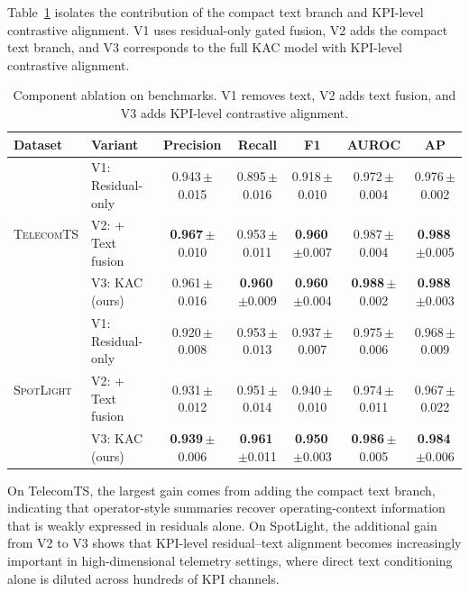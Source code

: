 \documentclass[conference]{IEEEtran}
\newcommand{\sd}[1]{\,{\fontsize{6pt}{7pt}\selectfont $\pm$#1}}
\begin{document}
Table~\ref{tab:ablation} isolates the contribution of the compact text branch and KPI-level contrastive alignment. V1 uses residual-only gated fusion, V2 adds the compact text branch, and V3 corresponds to the full KAC model with KPI-level contrastive alignment.

\begin{table}[t]
  \caption{Component ablation on benchmarks. V1 removes text, V2 adds text fusion, and V3 adds KPI-level contrastive alignment.}
  \label{tab:ablation}
  \small
  \setlength{\tabcolsep}{4pt}
  \begin{tabular*}{\textwidth}{@{\extracolsep{\fill}}ll|ccccc@{}}
    \toprule
    \textbf{Dataset} & \textbf{Variant} & \textbf{Precision} & \textbf{Recall} & \textbf{F1} & \textbf{AUROC} & \textbf{AP} \\
    \midrule
    \multirow{3}{*}{\textsc{TelecomTS}} & V1: Residual-only & 0.943\sd{0.015} & 0.895\sd{0.016} & 0.918\sd{0.010} & 0.972\sd{0.004} & 0.976\sd{0.002} \\
     & V2: + Text fusion & \textbf{0.967}\sd{0.010} & 0.953\sd{0.011} & \textbf{0.960}\sd{0.007} & 0.987\sd{0.004} & \textbf{0.988}\sd{0.005} \\
     & V3: KAC (ours) & 0.961\sd{0.016} & \textbf{0.960}\sd{0.009} & \textbf{0.960}\sd{0.004} & \textbf{0.988}\sd{0.002} & \textbf{0.988}\sd{0.003} \\
    \midrule
    \multirow{3}{*}{\textsc{SpotLight}} & V1: Residual-only & 0.920\sd{0.008} & 0.953\sd{0.013} & 0.937\sd{0.007} & 0.975\sd{0.006} & 0.968\sd{0.009} \\
     & V2: + Text fusion & 0.931\sd{0.012} & 0.951\sd{0.014} & 0.940\sd{0.010} & 0.974\sd{0.011} & 0.967\sd{0.022} \\
     & V3: KAC (ours) & \textbf{0.939}\sd{0.006} & \textbf{0.961}\sd{0.011} & \textbf{0.950}\sd{0.003} & \textbf{0.986}\sd{0.005} & \textbf{0.984}\sd{0.006} \\
    \bottomrule
  \end{tabular*}
\end{table}

On TelecomTS, the largest gain comes from adding the compact text branch, indicating that operator-style summaries recover operating-context information that is weakly expressed in residuals alone. On SpotLight, the additional gain from V2 to V3 shows that KPI-level residual--text alignment becomes increasingly important in high-dimensional telemetry settings, where direct text conditioning alone is diluted across hundreds of KPI channels.
\end{document}
